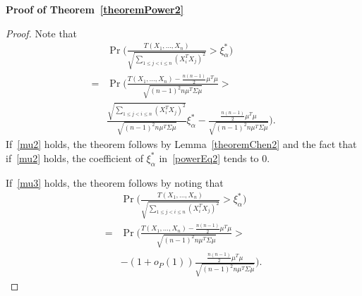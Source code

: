\documentclass[review]{elsarticle}
\theoremstyle{plain}
\theoremstyle{definition}
\theoremstyle{remark}
\begin{document}
\textbf{Proof of Theorem~\ref{theoremPower2}}
\begin{proof}
    Note that
    \begin{align}
            &\Pr\bigg(\frac{T( X_1,\ldots, X_n)}{\sqrt{\sum_{1\leq j<i\leq n}{(X_i^T X_j)}^2}}>\xi_{\alpha}^* \bigg)\nonumber\\
            =&
            \Pr\bigg(\frac{T( X_1,\ldots, X_n)-\frac{n(n-1)}{2}\mu^T\mu}{\sqrt{{(n-1)}^2 n \mu^T\Sigma\mu}}>
            \nonumber\\
            &\frac{\sqrt{\sum_{1\leq j<i\leq n}{{(X_i^T X_j)}^2}}}{\sqrt{{(n-1)}^2 n \mu^T\Sigma\mu}}\xi_{\alpha}^*-\frac{\frac{n(n-1)}{2}\mu^T\mu}{\sqrt{{(n-1)}^2 n \mu^T\Sigma\mu}} \bigg).
            \label{powerEq2}
    \end{align}
    If~\eqref{mu2} holds, the theorem follows by Lemma~\ref{theoremChen2} and the fact that if~\eqref{mu2} holds, the coefficient of $\xi_\alpha^*$ in~\eqref{powerEq2} tends to $0$.

    If~\eqref{mu3} holds, the theorem follows by noting that
    \begin{equation*}
        \begin{aligned}
            &\Pr\bigg(\frac{T( X_1,\ldots, X_n)}{\sqrt{\sum_{1\leq j<i\leq n}{(X_i^T X_j)}^2}}>\xi_{\alpha}^* \bigg)\\
            =&
            \Pr\bigg(\frac{T( X_1,\ldots, X_n)-\frac{n(n-1)}{2}\mu^T\mu}{\sqrt{{(n-1)}^2 n \mu^T\Sigma\mu}}>\\
            &-(1+o_P(1))\frac{\frac{n(n-1)}{2}\mu^T\mu}{\sqrt{{(n-1)}^2 n \mu^T\Sigma\mu}} \bigg).
        \end{aligned}
    \end{equation*}
\end{proof}
\end{document}
